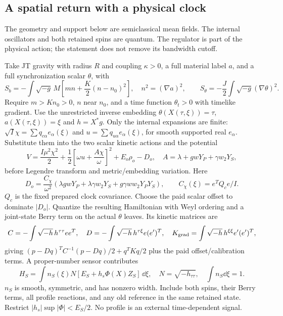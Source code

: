 \documentclass[12pt,a4paper]{article}
\begin{document}
\subsection{A spatial return with a physical clock}
\label{app:finite-spatial-return}

The geometry and support below are semiclassical mean fields. The internal
oscillators and both retained spins are quantum. The regulator is part of
the physical action; the statement does not remove its bandwidth cutoff.

Take JT gravity with radius $R$ and coupling $\kappa>0$, a full material
label $a$, and a full synchronization scalar $\theta$, with
\begin{equation}
 S_b=-\int\sqrt{-g}\,M\left[mn+\frac K2(n-n_0)^2\right],\quad
 n^2=(\nabla a)^2,\qquad
 S_\theta=-\frac J2\int\sqrt{-g}(\nabla\theta)^2.                 \label{eq:finite-spatial-1}
\end{equation}
Require $m>Kn_0>0$, $n$ near $n_0$, and a time function
$\theta_t>0$ with timelike gradient. Use the unrestricted inverse embedding
$\theta(X(\tau,\xi))=\tau$, $a(X(\tau,\xi))=\xi$ and
$h=X^*g$. Only the internal expansions are finite:
$\sqrt I\chi=\sum q_{c\alpha}e_\alpha(\xi)$ and
$u=\sum q_{u\alpha}e_\alpha(\xi)$, for smooth supported real $e_\alpha$.
Substitute them into the two scalar kinetic actions and the potential
\begin{equation}
 V=\frac{I\mu^2\chi^2}{2}
   +\frac12\left[\omega u+\frac{A\chi}{\omega}\right]^2
   +E_o\rho_o-D_o,
 \quad A=\lambda+gwY_P+\gamma w_2Y_S,                         \label{eq:finite-spatial-2}
\end{equation}
before Legendre transform and metric/embedding variation. Here
\[
 D_o=\frac{C_\chi}{\omega^2}
 (\lambda gwY_P+\lambda\gamma w_2Y_S+g\gamma ww_2Y_PY_S),
 \qquad C_\chi(\xi)=e^TQ_ce/I .
\]
$Q_c$ is the fixed prepared clock covariance. Choose the paid scalar
offset to dominate $|D_o|$. Quantize the resulting Hamiltonian with Weyl
ordering and a joint-state Berry term on the actual $\theta$ leaves. Its
kinetic matrices are
\[
 C=-\int\sqrt{-h}\,h^{\tau\tau}ee^T,\quad
 D=-\int\sqrt{-h}\,h^{\tau\xi}e(e')^T,\quad
 K_{\rm grad}=\int\sqrt{-h}\,h^{\xi\xi}e'(e')^T,
\]
giving $(p-Dq)^TC^{-1}(p-Dq)/2+q^TKq/2$ plus the paid
offset/calibration terms. A proper-number sensor contributes
\begin{equation}
 H_S=\int n_S(\xi)N[E_S+h_s\Phi(X)Z_S]\,\dd\xi,
 \quad N=\sqrt{-h_{\tau\tau}},\quad \int n_S\dd\xi=1.        \label{eq:finite-spatial-3}
\end{equation}
$n_S$ is smooth, symmetric, and has nonzero width. Include both spins,
their Berry terms, all profile reactions, and any old reference in the
same retained state. Restrict $|h_s|\sup|\Phi|<E_S/2$. No profile is an
external time-dependent signal.
\end{document}
